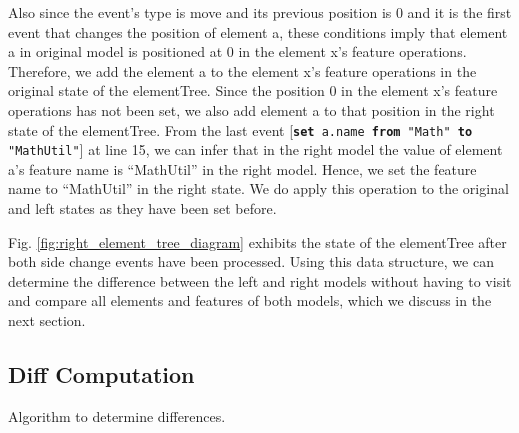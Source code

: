 \documentclass{llncs}
\begin{document}
Also since the event's type is \textsf{move} and its previous position is 0 and it is the first event that changes the position of element \textsf{a}, these conditions imply that element \textsf{a} in original model is positioned at 0 in the element \textsf{x}'s feature \textsf{operations}. Therefore, we add the element \textsf{a} to  the element \textsf{x}'s feature \textsf{operations} in the original state of the \textsf{elementTree}. Since the position 0 in the element \textsf{x}'s feature \textsf{operations} has not been set, we also add element \textsf{a} to that position in the right state of the \textsf{elementTree}. From the last event [\texttt{\small \textbf{set} a.name \textbf{from} "Math" \textbf{to} "MathUtil"}] at line 15, we can infer that in the right model the value of element \textsf{a}'s feature \textsf{name} is ``MathUtil'' in the right model. Hence, we set the feature \textsf{name} to ``MathUtil'' in the right state. We do apply this operation to the original and left states as they have been set before.  

Fig. \ref{fig:right_element_tree_diagram} exhibits the state of the \textsf{elementTree} after both side change events have been processed. Using this data structure, we can determine the difference between the left and right models without having to visit and compare all elements and features of both models, which we discuss in the next section.

\subsection{Diff Computation}
\label{sec:diff_computation}

\IncMargin{1.5em}
\begin{algorithm}[H]
    \begin{footnotesize}
    \end{footnotesize}
    \caption{Algorithm to determine differences.}
    \label{alg:diff_calculation}
\end{algorithm}
\DecMargin{1.5em}
\end{document}
